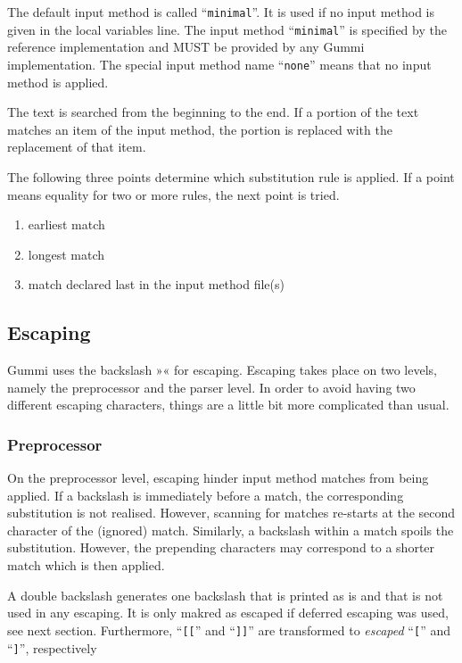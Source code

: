 \documentclass[12pt,openany]{book}
\begin{document}
The default input method is called ``\verb|minimal|''.  It is used if no input
method is given in the local variables line.  The input method
``\verb|minimal|'' is specified by the reference implementation and MUST be
provided by any Gummi implementation.  The special input method name
``\verb|none|'' means that no input method is applied.

The text is searched from the beginning to the end.  If a portion of the text
matches an item of the input method, the portion is replaced with the
replacement of that item.

The following three points determine which substitution rule is applied.  If a
point means equality for two or more rules, the next point is tried.

\begin{enumerate}
\item earliest match
\item longest match
\item match declared last in the input method file(s)
\end{enumerate}

\subsection{Escaping}

Gummi uses the backslash »« for escaping.  Escaping takes place on two
levels, namely the preprocessor and the parser level.  In order to avoid having
two different escaping characters, things are a little bit more complicated
than usual.

\subsubsection*{Preprocessor}

On the preprocessor level, escaping hinder input method matches from being
applied.  If a backslash is immediately before a match, the corresponding
substitution is not realised.  However, scanning for matches re-starts at the
second character of the (ignored) match.  Similarly, a backslash within a match
spoils the substitution.  However, the prepending characters may correspond to
a shorter match which is then applied.

A double backslash generates one backslash that is printed as is and that is
not used in any escaping.  It is only makred as escaped if deferred escaping
was used, see next section.  Furthermore, ``\verb|[[|'' and ``\verb|]]|'' are
transformed to \emph{escaped} ``\verb|[|'' and ``\verb|]|'', respectively
\end{document}
